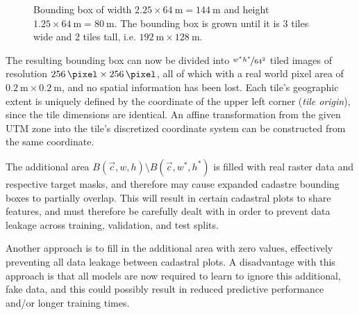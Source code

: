 \begin{figure}[H]
  \centering
  
  \caption{
    Bounding box of width $2.25 \times \SI{64}{\meter} = \SI{144}{\meter}$ and height $1.25 \times \SI{64}{\meter} = \SI{80}{\meter}$.
    The bounding box is grown until it is 3 tiles wide and 2 tiles tall, i.e. $\SI{192}{\meter} \times \SI{128}{\meter}$.
  }%
  \label{fig:bbox-growing}
\end{figure}

The resulting bounding box can now be divided into $\nicefrac{w^*h^*}{64^2}$ tiled images of resolution $\SI{256}{\pixel} \times \SI{256}{\pixel}$, all of which with a real world pixel area of $\SI{0.2}{\meter} \times \SI{0.2}{\meter}$, and no spatial information has been lost.
Each tile's geographic extent is uniquely defined by the coordinate of the upper left corner (\textit{tile origin}), since the tile dimensions are identical.
An affine transformation from the given UTM zone into the tile's discretized coordinate system can be constructed from the same coordinate.

The additional area $B(\vec{c}, w, h) \setminus B(\vec{c}, w^*, h^*)$ is filled with real raster data and respective target masks, and therefore may cause expanded cadastre bounding boxes to partially overlap.
This will result in certain cadastral plots to share features, and must therefore be carefully dealt with in order to prevent data leakage across training, validation, and test splits.

Another approach is to fill in the additional area with zero values, effectively preventing all data leakage between cadastral plots.
A disadvantage with this approach is that all models are now required to learn to ignore this additional, fake data, and this could possibly result in reduced predictive performance and/or longer training times.

